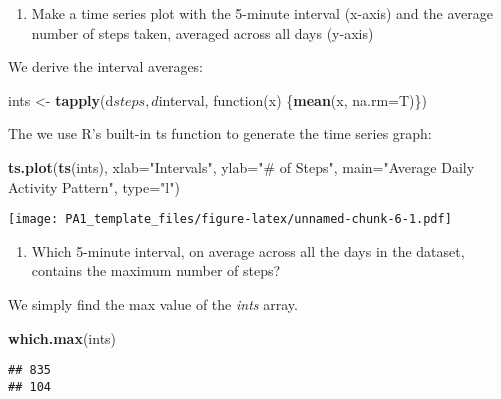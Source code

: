 \documentclass[]{article}
\newenvironment{Shaded}{\begin{snugshade}}{\end{snugshade}}
\newcommand{\KeywordTok}[1]{\textcolor[rgb]{0.13,0.29,0.53}{\textbf{{#1}}}}
\newcommand{\DataTypeTok}[1]{\textcolor[rgb]{0.13,0.29,0.53}{{#1}}}
\newcommand{\StringTok}[1]{\textcolor[rgb]{0.31,0.60,0.02}{{#1}}}
\newcommand{\NormalTok}[1]{{#1}}
\providecommand{\tightlist}{%
  \setlength{\itemsep}{0pt}\setlength{\parskip}{0pt}}
\begin{document}
\begin{enumerate}
\def\labelenumi{\arabic{enumi}.}
\tightlist
\item
  Make a time series plot with the 5-minute interval (x-axis) and the
  average number of steps taken, averaged across all days (y-axis)
\end{enumerate}

We derive the interval averages:

\begin{Shaded}
\begin{Highlighting}[]
\NormalTok{ints <-}\StringTok{ }\KeywordTok{tapply}\NormalTok{(d$steps, d$interval, function(x) \{}\KeywordTok{mean}\NormalTok{(x, }\DataTypeTok{na.rm=}\NormalTok{T)\})}
\end{Highlighting}
\end{Shaded}

The we use R's built-in ts function to generate the time series graph:

\begin{Shaded}
\begin{Highlighting}[]
\KeywordTok{ts.plot}\NormalTok{(}\KeywordTok{ts}\NormalTok{(ints), }\DataTypeTok{xlab=}\StringTok{"Intervals"}\NormalTok{, }\DataTypeTok{ylab=}\StringTok{"# of Steps"}\NormalTok{, }\DataTypeTok{main=}\StringTok{"Average Daily Activity Pattern"}\NormalTok{, }\DataTypeTok{type=}\StringTok{"l"}\NormalTok{)}
\end{Highlighting}
\end{Shaded}

\texttt{[image: PA1\_template\_files/figure-latex/unnamed-chunk-6-1.pdf]}

\begin{enumerate}
\def\labelenumi{\arabic{enumi}.}
\setcounter{enumi}{1}
\tightlist
\item
  Which 5-minute interval, on average across all the days in the
  dataset, contains the maximum number of steps?
\end{enumerate}

We simply find the max value of the \emph{ints} array.

\begin{Shaded}
\begin{Highlighting}[]
\KeywordTok{which.max}\NormalTok{(ints)}
\end{Highlighting}
\end{Shaded}

\begin{verbatim}
## 835 
## 104
\end{verbatim}
\end{document}
